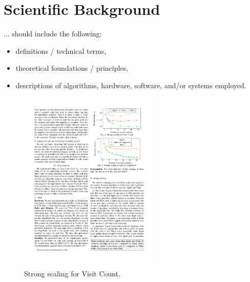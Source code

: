 \chapter{Scientific Background\label{cha:chapter2}}
... should include the following:
\begin{itemize}
    \item definitions / technical terms,
    \item theoretical foundations / principles,
    \item descriptions of algorithms, hardware, software, and/or systems employed.
\end{itemize}



\begin{figure}[h]
\centering
\includegraphics[width=0.6\textwidth]{./img/strong_scaling.pdf}
\caption{Strong scaling for Visit Count\cite{GevayRBMQM21}.}
\end{figure}




